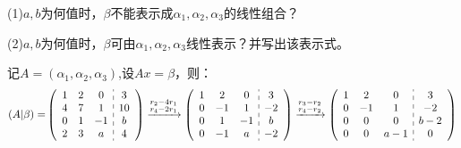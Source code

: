 \documentclass[a4paper]{report}
\begin{document}
(1)$a,b$为何值时，$\beta$不能表示成$\alpha_1,\alpha_2,\alpha_3$的线性组合？

(2)$a,b$为何值时，$\beta$可由$\alpha_1,\alpha_2,\alpha_3$线性表示？并写出该表示式。

\begin{jie}
记$A=(\alpha_1,\alpha_2,\alpha_3)$,设$Ax=\beta$，则：
\begin{align*}
(A|\beta)=
&
\left(
 \begin{array}{c:c}
\begin{matrix}
1 & 2 & 0\\
4 & 7 & 1 \\
0 & 1 & -1\\
2 & 3 & a
\end{matrix}&
\begin{matrix}
3  \\
10  \\
b \\
4
\end{matrix}
\end{array}
\right)\xrightarrow{\substack{r_{2}-4r_{1}\\ r_{4}-2r_{1}}}
{
\left(
 \begin{array}{c:c}
\begin{matrix}
1 & 2 & 0\\
0 & -1 & 1 \\
0 & 1 & -1\\
0 & -1 & a
\end{matrix}&
\begin{matrix}
3  \\
-2  \\
b \\
-2
\end{matrix}
\end{array}
\right)
}\xrightarrow{\substack{r_{3}-r_{2}\\ r_{4}-r_{2}}}
{
\left(
 \begin{array}{c:c}
\begin{matrix}
1 & 2 & 0\\
0 & -1 & 1 \\
0 & 0 & 0\\
0 & 0 & a-1
\end{matrix}&
\begin{matrix}
3  \\
-2  \\
b-2 \\
0
\end{matrix}
\end{array}
\right)}\\

\end{align*}
\end{jie}
\end{document}
